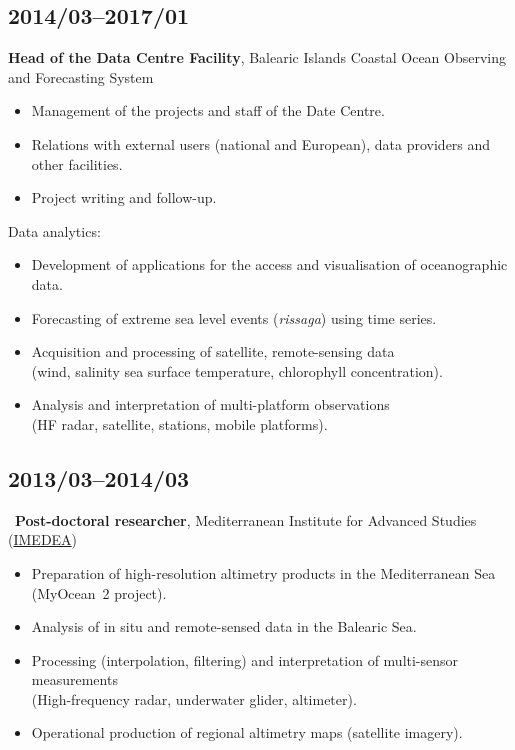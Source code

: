 \documentclass[11pt,a4paper,sans,svgnames]{article}
\begin{document}
\subsection{2014/03--2017/01}

\textbf{Head of the Data Centre Facility}, Balearic Islands Coastal Ocean Observing and Forecasting System%
\begin{itemize}%
\item Management of the projects and staff of the Date Centre.
\item Relations with external users (national and European), data providers and other facilities.
\item Project writing and follow-up.
\end{itemize}
Data analytics:
\begin{itemize}%
\item Development of applications for the access and visualisation of oceanographic data.
\item Forecasting of extreme sea level events (\textit{rissaga}) using time series.
\item Acquisition and processing of satellite, remote-sensing data\\(wind, salinity sea surface temperature, chlorophyll concentration).
\item Analysis and interpretation of multi-platform observations\\(HF radar, satellite, stations, mobile platforms).
\end{itemize}


\subsection{2013/03--2014/03}

~\textbf{Post-doctoral researcher}, Mediterranean Institute for Advanced Studies (\href{http://imedea.uib-csic.es/}{IMEDEA})

\begin{itemize}%
\item Preparation of high-resolution altimetry products in the Mediterranean Sea (MyOcean~2 project).
\item Analysis of in situ and remote-sensed data in the Balearic Sea.
\item Processing (interpolation, filtering) and interpretation of multi-sensor measurements\\(High-frequency radar, underwater glider, altimeter).
\item Operational production of regional altimetry maps (satellite imagery).
\end{itemize}
\end{document}
